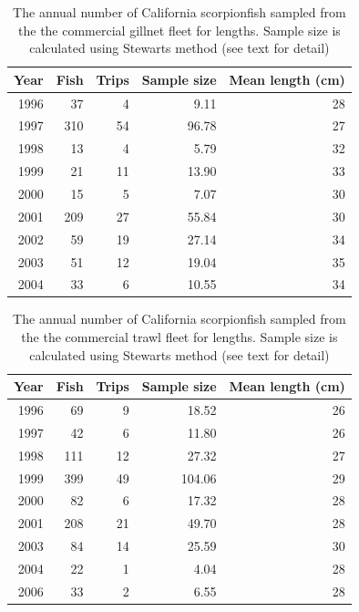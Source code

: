 \documentclass[12pt,]{article}
\begin{document}
\begin{table}[ht]
\centering
\caption{The annual number of California scorpionfish 
                                              sampled from the the commercial gillnet 
                                            fleet for lengths. Sample size is calculated 
                                            using Stewarts method (see text for detail)} 
\label{tab:ComNet_lengthsample}
\begin{tabular}{rrrrr}
  \hline
Year & Fish & Trips & Sample size & Mean length (cm) \\ 
  \hline
1996 & 37 & 4 & 9.11 & 28 \\ 
  1997 & 310 & 54 & 96.78 & 27 \\ 
  1998 & 13 & 4 & 5.79 & 32 \\ 
  1999 & 21 & 11 & 13.90 & 33 \\ 
  2000 & 15 & 5 & 7.07 & 30 \\ 
  2001 & 209 & 27 & 55.84 & 30 \\ 
  2002 & 59 & 19 & 27.14 & 34 \\ 
  2003 & 51 & 12 & 19.04 & 35 \\ 
  2004 & 33 & 6 & 10.55 & 34 \\ 
   \hline
\end{tabular}
\end{table}\vspace{2in}

\begin{table}[ht]
\centering
\caption{The annual number of California scorpionfish 
                                              sampled from the the commercial trawl 
                                            fleet for lengths. Sample size is calculated 
                                            using Stewarts method (see text for detail)} 
\label{tab:ComTrawl_lengthsample}
\begin{tabular}{rrrrr}
  \hline
Year & Fish & Trips & Sample size & Mean length (cm) \\ 
  \hline
1996 & 69 & 9 & 18.52 & 26 \\ 
  1997 & 42 & 6 & 11.80 & 26 \\ 
  1998 & 111 & 12 & 27.32 & 27 \\ 
  1999 & 399 & 49 & 104.06 & 29 \\ 
  2000 & 82 & 6 & 17.32 & 28 \\ 
  2001 & 208 & 21 & 49.70 & 28 \\ 
  2003 & 84 & 14 & 25.59 & 30 \\ 
  2004 & 22 & 1 & 4.04 & 28 \\ 
  2006 & 33 & 2 & 6.55 & 28 \\ 
   \hline
\end{tabular}
\end{table}
\end{document}
